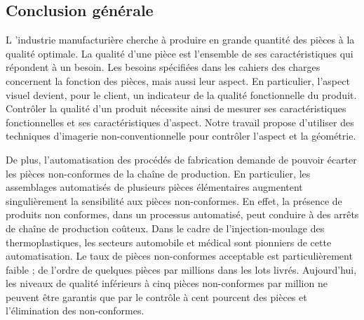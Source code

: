 

{}

\vspace*{-1cm}
\begin{flushright}
\section*{\fontsize{20pt}{20pt}\selectfont\textnormal{Conclusion générale}}
\end{flushright}
\vspace{2cm}

\chead[\fancyplain{}{}]
      {\fancyplain{}{}}
\lfoot[\fancyplain{}{}]
      {\fancyplain{}{}}
\cfoot[\fancyplain{}{\thepage}]
      {\fancyplain{}{\thepage}}
\rfoot[\fancyplain{}{}]
     {\fancyplain{}{\scriptsize}}

\label{ch:conclusion}
\lettrine[lines=1]{L}{ }'industrie manufacturière cherche à produire en grande quantité des pièces à la qualité optimale.
La qualité d'une pièce est l'ensemble de ses caractéristiques qui répondent à un besoin.
Les besoins spécifiées dans les cahiers des charges concernent la fonction des pièces, mais aussi leur aspect.
En particulier, l'aspect visuel devient, pour le client, un indicateur de la qualité fonctionnelle du produit.
Contrôler la qualité d'un produit nécessite ainsi de mesurer ses caractéristiques fonctionnelles et ses caractéristiques d'aspect.
Notre travail propose d'utiliser des techniques d'imagerie non-conventionnelle pour contrôler l'aspect et la géométrie.

De plus, l'automatisation des procédés de fabrication demande de pouvoir écarter les pièces non-conformes de la chaîne de production.
En particulier, les assemblages automatisés de plusieurs pièces élémentaires augmentent singulièrement la sensibilité aux pièces non-conformes.
En effet, la présence de produits non conformes, dans un processus automatisé, peut conduire à des arrêts de chaîne de production coûteux.
Dans le cadre de l'injection-moulage des thermoplastiques, les secteurs automobile et médical sont pionniers de cette automatisation.
Le taux de pièces non-conformes acceptable est particulièrement faible ; de l'ordre de quelques pièces par millions dans les lots livrés.
Aujourd'hui, les niveaux de qualité inférieurs à cinq pièces non-conformes par million ne peuvent être garantis que par le contrôle à cent pourcent des pièces et l'élimination des non-conformes.  %

